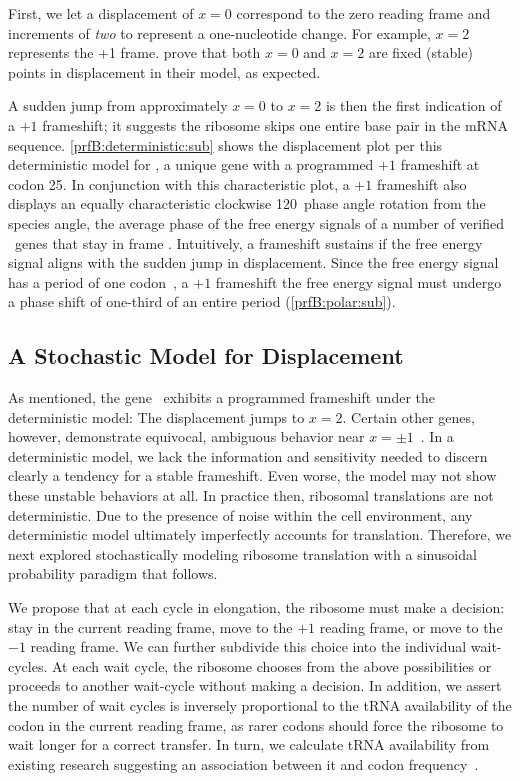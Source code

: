 \documentclass[12pt, draft]{article}
\numberwithin{equation}{section}
\begin{document}
First, we let a displacement of $x = 0$ correspond to the zero reading
frame and increments of \emph{two} to represent a one-nucleotide
change. For example, $x =2$ represents the +1 frame.
\citet{lalit:embs} prove that both $x = 0$ and $x = 2$ are fixed
(stable) points in displacement in their model, as expected.

A sudden jump from approximately $x = 0$ to $x = 2$ is then the first
indication of a $+1$ frameshift; it suggests the ribosome skips one
entire base pair in the mRNA sequence.  \autoref{prfB:deterministic:sub}
shows the displacement plot per this deterministic model for \prfB, a
unique gene with a programmed $+1$ frameshift at codon 25. In
conjunction with this characteristic plot, a $+1$ frameshift also
displays an equally characteristic clockwise 120\degree\ phase angle
rotation from the species angle, the average phase of the free energy
signals of a number of verified \ecoli\ genes that stay in frame \cite{lalit:mechanics}.  Intuitively, a
frameshift sustains if the free energy signal aligns with the sudden
jump in displacement.  Since the free energy signal has a period of
one codon~\cite{lalit:mechanics}, a $+1$ frameshift the free energy
signal must undergo a phase shift of one-third of an entire period
(\autoref{prfB:polar:sub}).

\subsection{A Stochastic Model for Displacement}
\label{stochastic}

As mentioned, the gene \prfB\ exhibits a programmed frameshift under
the deterministic model: The displacement jumps to $x=2$.  Certain
other genes, however, demonstrate equivocal, ambiguous behavior near
$x = \pm 1$~\cite{lalit:embs}.  In a deterministic model, we lack the
information and sensitivity needed to discern clearly a tendency for a
stable frameshift. Even worse, the model may not show these unstable
behaviors at all. In practice then, ribosomal translations are not
deterministic. Due to the presence of noise within the cell
environment, any deterministic model ultimately imperfectly accounts
for translation. Therefore, we next explored stochastically modeling
ribosome translation with a sinusoidal probability paradigm that
follows.

We propose that at each cycle in elongation, the ribosome must make a
decision: stay in the current reading frame, move to the $+1$ reading
frame, or move to the $-1$ reading frame.  We can further subdivide
this choice into the individual wait-cycles.  At each wait cycle, the
ribosome chooses from the above possibilities or proceeds to another
wait-cycle without making a decision.  In addition, we assert the 
number of wait cycles is inversely proportional to the tRNA availability of 
the codon in the current reading frame, as rarer codons should force the 
ribosome to wait longer for a correct transfer. In turn, we calculate
tRNA availability from existing research suggesting an association
between it and codon frequency~\cite{ikemura}.
\end{document}
